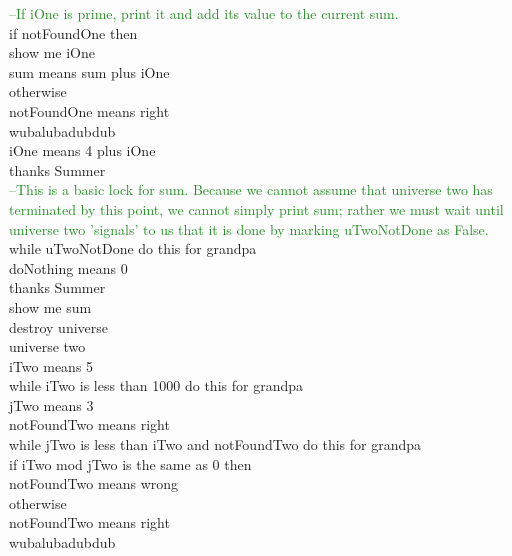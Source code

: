 \documentclass[numbers]{sigplanconf}
\begin{document}
{\textcolor{ForestGreen}{    --If iOne is prime, print it and add its value to the current sum.} \\
\indent \indent if notFoundOne then \\
\indent \indent \indent show me iOne \\
\indent \indent \indent sum means sum plus iOne \\
\indent \indent otherwise \\
\indent \indent \indent notFoundOne means right \\
\indent \indent wubalubadubdub \\

\indent \indent \noindent iOne means 4 plus iOne \\
\indent \noindent thanks Summer \\

\textcolor{ForestGreen}{  --This is a basic lock for sum. Because we cannot assume that universe two has terminated by this point, we cannot simply print sum; rather we must wait until universe two 'signals' to us that it is done by marking uTwoNotDone as False.} \\
\indent while uTwoNotDone do this for grandpa \\
\indent \indent doNothing means 0 \\
\indent thanks Summer \\

\indent \noindent show me sum \\

\noindent destroy universe \\


\noindent universe two \\

\indent \noindent iTwo means 5 \\

\indent \noindent while iTwo is less than 1000 do this for grandpa \\

\indent \indent \noindent jTwo means 3 \\

\indent \indent \noindent notFoundTwo means right \\

\indent \indent \noindent while jTwo is less than iTwo and notFoundTwo do this for grandpa \\

\indent \indent \indent \noindent if iTwo mod jTwo is the same as 0 then \\
\indent \indent \indent \indent notFoundTwo means wrong \\
\indent \indent \indent otherwise \\
\indent \indent \indent \indent notFoundTwo means right \\
\indent \indent \indent wubalubadubdub \\

}
\end{document}
